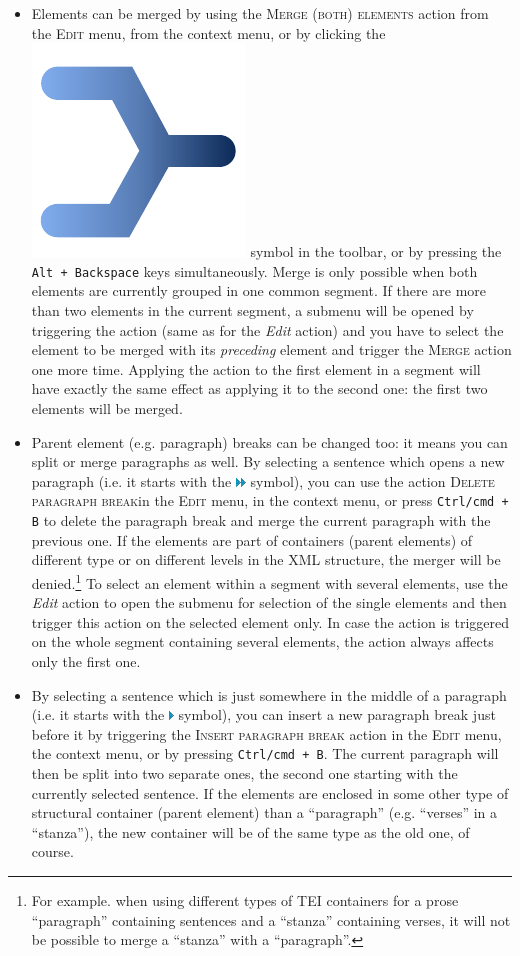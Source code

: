 \documentclass[a4paper,10pt,oneside]{book}
\newcommand{\keys}[1]{\texttt{#1}}
\newcommand{\menu}[1]{\textsc{#1}}
\begin{document}
\begin{itemize}
 \item Elements can be merged by using the \menu{Merge (both) elements} action from the \menu{Edit} menu, from the context menu, or by clicking the \includegraphics[height=2ex]{merge.pdf} symbol in the toolbar, or by pressing the \keys{Alt + Backspace} keys simultaneously. Merge is only possible when both elements are currently grouped in one common segment. If there are more than two elements in the current segment, a submenu will be opened by triggering the action (same as for the \emph{Edit} action) and you have to select the element to be merged with its \emph{preceding} element and trigger the \menu{Merge} action one more time. Applying the action to the first element in a segment will have exactly the same effect as applying it to the second one: the first two elements will be merged.
 \item Parent element (e.g. paragraph) breaks can be changed too: it means you can split or merge paragraphs as well. By selecting a sentence which opens a new paragraph (i.e. it starts with the \includegraphics[height=1ex]{../images/16/dblarrow.png} symbol), you can use the action \menu{Delete paragraph break}in the \menu{Edit} menu, in the context menu, or press \keys{Ctrl/cmd + B} to delete the paragraph break and merge the current paragraph with the previous one. If the elements are part of containers (parent elements) of different type or on different levels in the XML structure, the merger will be denied.\footnote{For example. when using different types of TEI containers for a prose ``paragraph'' containing sentences and a ``stanza'' containing verses, it will not be possible to merge a ``stanza'' with a ``paragraph''.} To select an element within a segment with several elements, use the \emph{Edit} action to open the submenu for selection of the single elements and then trigger this action on the selected element only. In case the action is triggered on the whole segment containing several elements, the action always affects only the first one.
 \item By selecting a sentence which is just somewhere in the middle of a paragraph (i.e. it starts with the \includegraphics[height=1ex]{../images/16/arrow.png} symbol), you can insert a new paragraph break just before it by triggering the \menu{Insert paragraph break} action in the \menu{Edit} menu, the context menu, or by pressing \keys{Ctrl/cmd + B}. The current paragraph will then be split into two separate ones, the second one starting with the currently selected sentence. If the elements are enclosed in some other type of structural container (parent element) than a ``paragraph'' (e.g. ``verses'' in a ``stanza''), the new container will be of the same type as the old one, of course.
\end{itemize}
\end{document}
